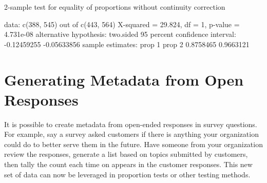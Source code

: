 2-sample test for equality of proportions without continuity
        correction

data:  c(388, 545) out of c(443, 564)
X-squared = 29.824, df = 1, p-value = 4.731e-08
alternative hypothesis: two.sided
95 percent confidence interval:
 -0.12459255 -0.05633856
sample estimates:
   prop 1    prop 2 
0.8758465 0.9663121 

\section{Generating Metadata from Open Responses}
It is possible to create metadata from open-ended responses in survey questions. For example, say a survey asked customers if there is anything your organization could do to better serve them in the future. Have someone from your organization review the responses, generate a list based on topics submitted by customers, then tally the count each time on appears in the customer responses. This new set of data can now be leveraged in proportion tests or other testing methods.